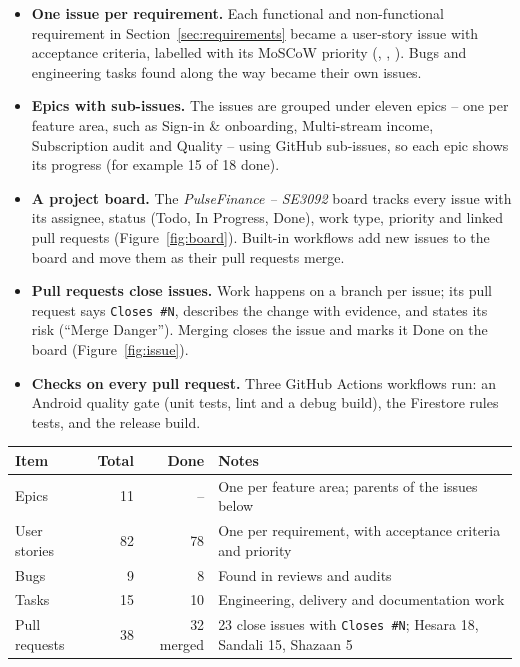 \documentclass[11pt,a4paper]{article}
\begin{document}
\begin{itemize}
  \item \textbf{One issue per requirement.} Each functional and non-functional requirement in Section~\ref{sec:requirements} became a user-story issue with acceptance criteria, labelled with its MoSCoW priority (, , ). Bugs and engineering tasks found along the way became their own issues.
  \item \textbf{Epics with sub-issues.} The issues are grouped under eleven epics -- one per feature area, such as Sign-in \& onboarding, Multi-stream income, Subscription audit and Quality -- using GitHub sub-issues, so each epic shows its progress (for example 15 of 18 done).
  \item \textbf{A project board.} The \emph{PulseFinance -- SE3092} board tracks every issue with its assignee, status (Todo, In Progress, Done), work type, priority and linked pull requests (Figure~\ref{fig:board}). Built-in workflows add new issues to the board and move them as their pull requests merge.
  \item \textbf{Pull requests close issues.} Work happens on a branch per issue; its pull request says \texttt{Closes \#N}, describes the change with evidence, and states its risk (``Merge Danger''). Merging closes the issue and marks it Done on the board (Figure~\ref{fig:issue}).
  \item \textbf{Checks on every pull request.} Three GitHub Actions workflows run: an Android quality gate (unit tests, lint and a debug build), the Firestore rules tests, and the release build.
\end{itemize}

\begin{tabularx}{\textwidth}{|L|r|r|L|}
\hline
\textbf{Item} & \textbf{Total} & \textbf{Done} & \textbf{Notes}\\
\hline
Epics & 11 & -- & One per feature area; parents of the issues below\\
User stories & 82 & 78 & One per requirement, with acceptance criteria and priority\\
Bugs & 9 & 8 & Found in reviews and audits\\
Tasks & 15 & 10 & Engineering, delivery and documentation work\\
Pull requests & 38 & 32 merged & 23 close issues with \texttt{Closes \#N}; Hesara 18, Sandali 15, Shazaan 5\\
\hline
\end{tabularx}
\end{document}
